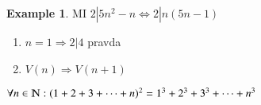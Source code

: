 \documentclass{article}
\theoremstyle{definition}
\newtheorem{exmp}{Example}[section]
\begin{document}
\begin{exmp}
    MI
$2|5n^2-n \Leftrightarrow 2|n(5n-1)$

    \begin{enumerate}
        \item $ n = 1 \Rightarrow 2|4$ pravda
        \item $V(n) \Rightarrow V(n+1)$
    \end{enumerate}
\end{exmp}


    $\forall n \in \varmathbb{N}: (1+2+3+\dots+n)^2 = 1^3+2^3+3^3+\dots+n^3$
\end{document}

